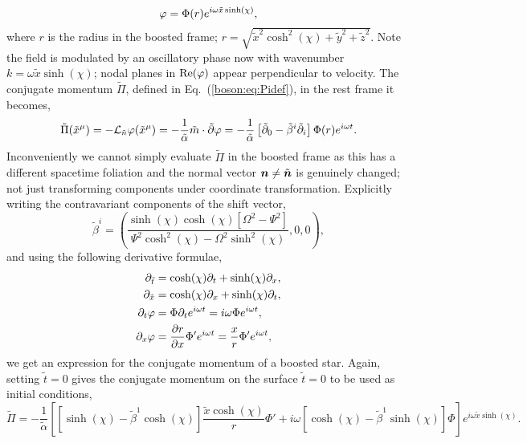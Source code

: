 \begin{equation}\varphi = \Phi(r)e^{i\omega \tilde{x}\sinh(\chi)}, \end{equation}
where $r$ is the radius in the boosted frame; $r = \sqrt{\tilde{x}^2\cosh^2(\chi) +\tilde{y}^2 + \tilde{z}^2}$.
Note the field is modulated by an oscillatory phase now with wavenumber $k = \omega \tilde{x} \sinh(\chi)$; nodal planes in $\Re(\varphi)$ appear perpendicular to velocity. The conjugate momentum $\tilde{\Pi}$, defined in Eq.~(\ref{boson:eq:Pidef}), in the rest frame it becomes, 
\begin{equation} \tilde{\Pi}(\tilde{x}^\mu) = -\mathcal{L}_{\tilde{n}} \varphi(\tilde{x}^\mu)=-\frac{1}{\tilde{\alpha}}\tilde{m}\cdot \tilde{\partial}\varphi = -\frac{1}{\tilde{\alpha}}\left[ \tilde{\partial}_0 - \tilde{\beta}^i\tilde{\partial}_{i}\right]\Phi(r)e^{i\omega t}.\end{equation}
Inconveniently we cannot simply evaluate $\tilde{\Pi}$ in the boosted frame as this has a different spacetime foliation and the normal vector $\boldsymbol{n}\neq \tilde{\boldsymbol{n}}$ is genuinely changed; not just transforming components under coordinate transformation. Explicitly writing the contravariant components of the shift vector, 
\begin{equation} \tilde{\beta}^i = \left(\frac{\sinh (\chi)  \cosh (\chi)  \left[\Omega ^2-\Psi ^2\right]}{\Psi ^2 \cosh
   ^2(\chi) -\Omega ^2 \sinh ^2(\chi) },0,0\right),\end{equation}
and using the following derivative formulae,
\begin{align} 
{\partial}_{\tilde{t}} &= \cosh(\chi) \partial_t + \sinh(\chi) \partial_x, \\
{\partial}_{\tilde{x}} &= \cosh(\chi) \partial_x + \sinh(\chi) \partial_t,\\
 \partial_t\varphi &=\Phi\partial_te^{i\omega t} =i\omega \Phi e^{i\omega t},\\
 \partial_x\varphi &=\frac{\partial r}{\partial x}\Phi'e^{i\omega t} = \frac{x}{r}\Phi'e^{i\omega t} ,
 \end{align}
we get an expression for the conjugate momentum of a boosted star. Again, setting $\tilde{t}=0$ gives the conjugate momentum on the surface $\tilde{t}=0$ to be used as initial conditions, 
\begin{equation} \widetilde{\Pi} = -\frac{1}{\tilde{\alpha}}\left[  \left[ \sinh(\chi)-\tilde{\beta}^1 \cosh(\chi)\right]\frac{\tilde{x}\cosh(\chi)}{r}\Phi' + i\omega \left[ \cosh(\chi)-\tilde{\beta}^1\sinh(\chi)\right]\Phi\right]e^{i\omega \tilde{x}\sinh(\chi)}.\end{equation}
